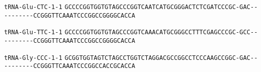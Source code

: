 \documentclass{article}
\newcommand{\rnabox}[1]{\colorbox{#1}{\texttt{#1}}}
\begin{document}
\vspace{-0.5mm}

\texttt{tRNA-Glu-CTC-1-1}
\rnabox{G}\rnabox{C}\rnabox{C}\rnabox{C}\rnabox{C}\rnabox{G}\rnabox{G}\rnabox{T}\rnabox{G}\rnabox{G}\rnabox{T}\rnabox{G}\rnabox{T}\rnabox{A}\rnabox{G}\rnabox{C}\rnabox{C}\rnabox{C}\rnabox{G}\rnabox{G}\rnabox{T}\rnabox{C}\rnabox{A}\rnabox{A}\rnabox{T}\rnabox{C}\rnabox{A}\rnabox{T}\rnabox{G}\rnabox{C}\rnabox{G}\rnabox{G}\rnabox{G}\rnabox{A}\rnabox{C}\rnabox{T}\rnabox{C}\rnabox{T}\rnabox{C}\rnabox{G}\rnabox{A}\rnabox{T}\rnabox{C}\rnabox{C}\rnabox{C}\rnabox{G}\rnabox{C}\rnabox{-}\rnabox{G}\rnabox{A}\rnabox{C}\rnabox{-}\rnabox{-}\rnabox{-}\rnabox{-}\rnabox{-}\rnabox{-}\rnabox{-}\rnabox{-}\rnabox{-}\rnabox{-}\rnabox{C}\rnabox{C}\rnabox{G}\rnabox{G}\rnabox{G}\rnabox{T}\rnabox{T}\rnabox{C}\rnabox{A}\rnabox{A}\rnabox{A}\rnabox{T}\rnabox{C}\rnabox{C}\rnabox{C}\rnabox{G}\rnabox{G}\rnabox{C}\rnabox{C}\rnabox{G}\rnabox{G}\rnabox{G}\rnabox{G}\rnabox{C}\rnabox{A}\rnabox{C}\rnabox{C}\rnabox{A}

\vspace{-0.5mm}

\texttt{tRNA-Glu-TTC-1-1}
\rnabox{G}\rnabox{C}\rnabox{C}\rnabox{C}\rnabox{C}\rnabox{G}\rnabox{G}\rnabox{T}\rnabox{G}\rnabox{G}\rnabox{T}\rnabox{G}\rnabox{T}\rnabox{A}\rnabox{G}\rnabox{C}\rnabox{C}\rnabox{C}\rnabox{G}\rnabox{G}\rnabox{T}\rnabox{C}\rnabox{A}\rnabox{A}\rnabox{A}\rnabox{C}\rnabox{A}\rnabox{T}\rnabox{G}\rnabox{C}\rnabox{G}\rnabox{G}\rnabox{G}\rnabox{C}\rnabox{C}\rnabox{T}\rnabox{T}\rnabox{T}\rnabox{C}\rnabox{G}\rnabox{A}\rnabox{G}\rnabox{C}\rnabox{C}\rnabox{C}\rnabox{G}\rnabox{C}\rnabox{-}\rnabox{G}\rnabox{C}\rnabox{C}\rnabox{-}\rnabox{-}\rnabox{-}\rnabox{-}\rnabox{-}\rnabox{-}\rnabox{-}\rnabox{-}\rnabox{-}\rnabox{-}\rnabox{C}\rnabox{C}\rnabox{G}\rnabox{G}\rnabox{G}\rnabox{T}\rnabox{T}\rnabox{C}\rnabox{A}\rnabox{A}\rnabox{A}\rnabox{T}\rnabox{C}\rnabox{C}\rnabox{C}\rnabox{G}\rnabox{G}\rnabox{C}\rnabox{C}\rnabox{G}\rnabox{G}\rnabox{G}\rnabox{G}\rnabox{C}\rnabox{A}\rnabox{C}\rnabox{C}\rnabox{A}

\vspace{-0.5mm}

\texttt{tRNA-Gly-CCC-1-1}
\rnabox{G}\rnabox{C}\rnabox{G}\rnabox{G}\rnabox{T}\rnabox{G}\rnabox{G}\rnabox{T}\rnabox{A}\rnabox{G}\rnabox{T}\rnabox{C}\rnabox{T}\rnabox{A}\rnabox{G}\rnabox{C}\rnabox{C}\rnabox{T}\rnabox{G}\rnabox{G}\rnabox{T}\rnabox{C}\rnabox{T}\rnabox{A}\rnabox{G}\rnabox{G}\rnabox{A}\rnabox{C}\rnabox{G}\rnabox{C}\rnabox{C}\rnabox{G}\rnabox{G}\rnabox{C}\rnabox{C}\rnabox{T}\rnabox{C}\rnabox{C}\rnabox{C}\rnabox{A}\rnabox{A}\rnabox{G}\rnabox{C}\rnabox{C}\rnabox{G}\rnabox{G}\rnabox{C}\rnabox{-}\rnabox{G}\rnabox{A}\rnabox{C}\rnabox{-}\rnabox{-}\rnabox{-}\rnabox{-}\rnabox{-}\rnabox{-}\rnabox{-}\rnabox{-}\rnabox{-}\rnabox{-}\rnabox{C}\rnabox{C}\rnabox{G}\rnabox{G}\rnabox{G}\rnabox{T}\rnabox{T}\rnabox{C}\rnabox{A}\rnabox{A}\rnabox{A}\rnabox{T}\rnabox{C}\rnabox{C}\rnabox{C}\rnabox{G}\rnabox{G}\rnabox{C}\rnabox{C}\rnabox{A}\rnabox{C}\rnabox{C}\rnabox{G}\rnabox{C}\rnabox{A}\rnabox{C}\rnabox{C}\rnabox{A}
\end{document}
